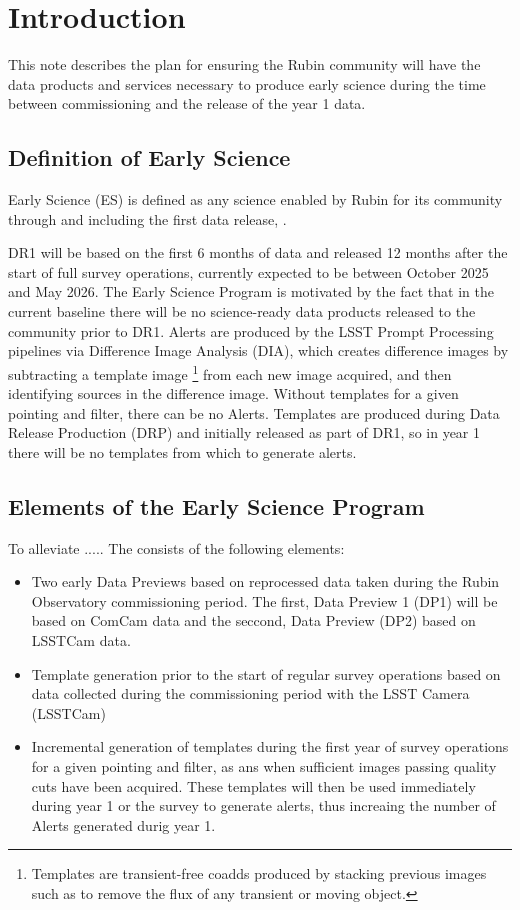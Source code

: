 \section{Introduction}

This  note describes the plan for ensuring the Rubin community will have the data products and services necessary to produce early science during the time between commissioning and the release of the year 1 data.

\subsection{Definition of Early Science}  \label{ssec:defn}

Early Science (ES) is defined as any science enabled by Rubin for its community through and including the first data release, \drone.

DR1 will be based on the first 6 months of data and released 12 months after the start of full survey operations, currently expected to be between October 2025 and May 2026.
The Early Science Program is motivated by the fact that in the current baseline there will be no science-ready data products released to the community prior to DR1. 
Alerts are produced by the LSST Prompt Processing pipelines via Difference Image Analysis (DIA), which creates difference images by subtracting a template image \footnote{Templates are transient-free coadds produced by stacking previous images such as to remove the flux of any transient or moving object.} from each new image acquired, and then identifying sources in the difference image. 
Without templates for a given pointing and filter, there can be no Alerts.
Templates are produced during Data Release Production (DRP) and initially released as part of DR1, so in year 1 there will be no templates from which to generate alerts.


\subsection{Elements of the Early Science Program}

To  alleviate  .....  The \esp consists of the following elements:
\begin{itemize}
	\item Two early Data Previews based on reprocessed data taken during the Rubin Observatory commissioning period. The first, Data Preview 1 (DP1) will be based on ComCam data and the seccond, Data Preview (DP2) based on LSSTCam data. 
	\item Template generation prior to the start of regular survey operations based on data collected during the commissioning period with the LSST Camera (LSSTCam)
	\item Incremental generation of templates during the first year of survey operations for a given pointing and filter, as ans when sufficient images passing quality cuts have been acquired. 
	These templates will then be used immediately during year 1 or the survey to generate alerts, thus increaing the number of Alerts generated durig year 1. 
\end{itemize}



